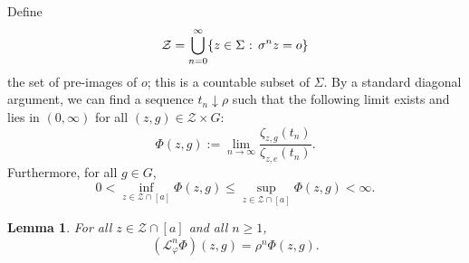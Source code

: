 \documentclass[11pt,letterpaper]{amsart}
\newtheorem{lemma}[theorem]{Lemma}
\theoremstyle{definition}
\numberwithin{equation}{section}
\numberwithin{theorem}{section}
\def\vp{\varphi}
\begin{document}
Define 
\[
\mathcal Z = \bigcup_{n=0}^\infty \{z\in \Sigma \hbox{ : } \sigma^nz=o\}
\]
the set of pre-images of $o$;
this is a 
countable subset of $\Sigma$.
By a standard diagonal argument, we can find a sequence $t_n \downarrow \rho$ such that
the following limit exists and lies in $(0,\infty)$ for all $(z,g) \in \mathcal Z \times G$:
\[
\Phi(z,g) := \lim_{n \to \infty} \frac{\zeta_{z,g}(t_n)}{\zeta_{z,e}(t_n)}.
\]
Furthermore, for all $g \in G$,
\begin{equation}\label{eq:bounds_for_Phi}
0 < \inf_{z\in \mathcal Z \cap [a]} \Phi(z,g) \le \sup_{z\in \mathcal Z \cap [a]} \Phi(z,g) <\infty.
\end{equation}


\begin{lemma}\label{lem:eigenvalue_equation}
For all $z \in \mathcal Z \cap [a]$ and all $n \ge 1$,
\[
(\mathcal L_{\vp}^n\Phi)(z,g) = \rho^n\Phi(z,g).
\]
\end{lemma}
\end{document}
